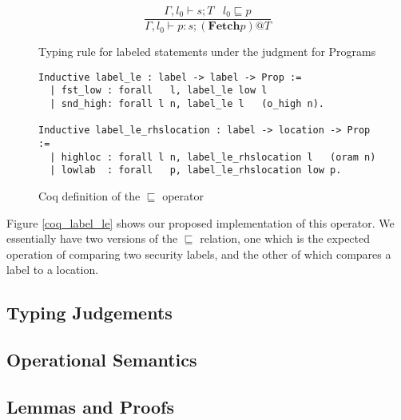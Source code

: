 \documentclass[10pt,  onecolumn]{article}
\begin{document}
\begin{figure}
\caption{ Typing rule for labeled statements under the judgment for Programs}
\label{fig:mto_rule_statement}
\[
\frac{ \Gamma, l_{0} \vdash s;T \;\;\; l_{0} \sqsubseteq p }
	{ \Gamma, l_{0} \vdash p:s;(\textbf{Fetch} p)@T}
\]
\end{figure}

\begin{figure}
\caption{ Coq definition of the $\sqsubseteq$ operator }
\label{fig:coq_label_le}
\begin{lstlisting}
Inductive label_le : label -> label -> Prop :=
  | fst_low : forall   l, label_le low l
  | snd_high: forall l n, label_le l   (o_high n).

Inductive label_le_rhslocation : label -> location -> Prop :=
  | highloc : forall l n, label_le_rhslocation l   (oram n)
  | lowlab  : forall   p, label_le_rhslocation low p.
\end{lstlisting}

\end{figure}

Figure \ref{coq_label_le} shows our proposed implementation of this operator.
We essentially have two versions of the $\sqsubseteq$ relation, one which is the expected operation of comparing two security labels, and the other of which compares a label to a location.




\subsection{ Typing Judgements }












	\subsection{ Operational Semantics }
	\subsection{ Lemmas and Proofs }

\end{document}
